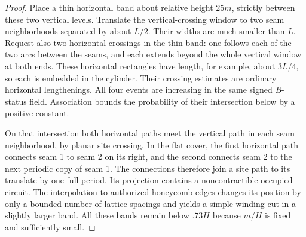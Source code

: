 \begin{proof}
Place a thin horizontal band about relative height $25m$, strictly
between these two vertical levels.  Translate the vertical-crossing
window to two seam neighborhoods separated by about $L/2$.  Their
widths are much smaller than $L$.  Request also two horizontal
crossings in the thin band: one follows each of the two arcs between
the seams, and each extends beyond the whole vertical window at both
ends.  These horizontal rectangles have length, for example, about
$3L/4$, so each is embedded in the cylinder.  Their crossing estimates
are ordinary horizontal lengthenings.  All four events are increasing
in the same signed $B$-status field.  Association bounds the probability
of their intersection below by a positive constant.

On that intersection both horizontal paths meet the vertical path in
each seam neighborhood, by planar site crossing.  In the flat cover,
the first horizontal path connects seam 1 to seam 2 on its right, and
the second connects seam 2 to the next periodic copy of seam 1.  The
connections therefore join a site path to its translate by one full
period.  Its projection contains a noncontractible occupied circuit.
The interpolation to authorized honeycomb edges changes its position
by only a bounded number of lattice spacings and yields a simple
winding cut in a slightly larger band.  All these bands remain below
$.73H$ because $m/H$ is fixed and sufficiently small.
\end{proof}

